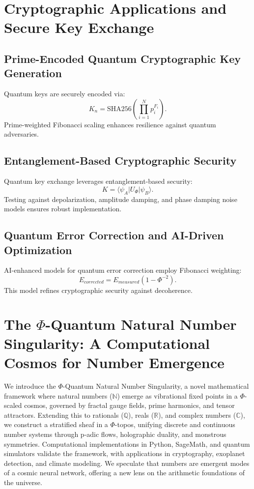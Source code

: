 \documentclass{article}
\theoremstyle{plain}
\begin{document}
\section{Cryptographic Applications and Secure Key Exchange}
\subsection{Prime-Encoded Quantum Cryptographic Key Generation}
Quantum keys are securely encoded via:
\begin{equation}
    K_n = \text{SHA256} \left( \prod_{i=1}^{N} p_i^{F_i} \right).
\end{equation}
Prime-weighted Fibonacci scaling enhances resilience against quantum adversaries.

\subsection{Entanglement-Based Cryptographic Security}
Quantum key exchange leverages entanglement-based security:
\begin{equation}
    K = \langle \psi_A | U_{\Phi} | \psi_B \rangle.
\end{equation}
Testing against depolarization, amplitude damping, and phase damping noise models ensures robust implementation.
\subsection{Quantum Error Correction and AI-Driven Optimization}
AI-enhanced models for quantum error correction employ Fibonacci weighting:
\begin{equation}
    E_{corrected} = E_{measured} (1 - \Phi^{-2}).
\end{equation}
This model refines cryptographic security against decoherence.
\section{The $\Phi$-Quantum Natural Number Singularity: A Computational Cosmos for Number Emergence}

We introduce the $\Phi$-Quantum Natural Number Singularity, a novel mathematical framework where natural numbers ($\mathbb{N}$) emerge as vibrational fixed points in a $\Phi$-scaled cosmos, governed by fractal gauge fields, prime harmonics, and tensor attractors. Extending this to rationals ($\mathbb{Q}$), reals ($\mathbb{R}$), and complex numbers ($\mathbb{C}$), we construct a stratified sheaf in a $\Phi$-topos, unifying discrete and continuous number systems through p-adic flows, holographic duality, and monstrous symmetries. Computational implementations in Python, SageMath, and quantum simulators validate the framework, with applications in cryptography, exoplanet detection, and climate modeling. We speculate that numbers are emergent modes of a cosmic neural network, offering a new lens on the arithmetic foundations of the universe.
\end{document}

